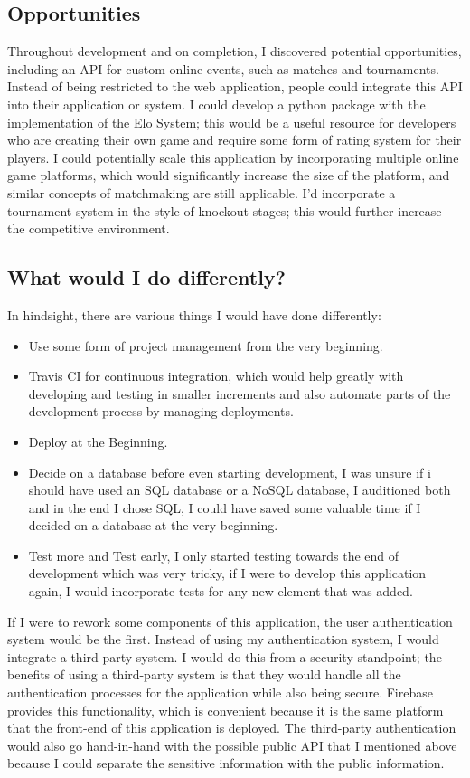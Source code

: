 \subsection{Opportunities}
Throughout development and on completion, I discovered potential opportunities, including an API for custom online events, such as matches and tournaments. Instead of being restricted to the web application, people could integrate this API into their application or system. I could develop a python package with the implementation of the Elo System; this would be a useful resource for developers who are creating their own game and require some form of rating system for their players.
I could potentially scale this application by incorporating multiple online game platforms, which would significantly increase the size of the platform, and similar concepts of matchmaking are still applicable. I'd incorporate a tournament system in the style of knockout stages; this would further increase the competitive environment.

\subsection{What would I do differently?}

In hindsight, there are various things I would have done differently:
\begin{itemize}
	\item Use some form of project management from the very beginning.
	\item Travis CI for continuous integration, which would help greatly with developing and testing in smaller increments and also automate parts of the development process by managing deployments.
	\item Deploy at the Beginning.
	\item Decide on a database before even starting development, I was unsure if i should have used an SQL database or a NoSQL database, I auditioned both and in the end I chose SQL, I could have saved some valuable time if I decided on a database at the very beginning.
	\item Test more and Test early, I only started testing towards the end of development which was very tricky, if I were to develop this application again, I would incorporate tests for any new element that was added.
\end{itemize}

If I were to rework some components of this application, the user authentication system would be the first. Instead of using my authentication system, I would integrate a third-party system. I would do this from a security standpoint; the benefits of using a third-party system is that they would handle all the authentication processes for the application while also being secure. Firebase provides this functionality, which is convenient because it is the same platform that the front-end of this application is deployed. The third-party authentication would also go hand-in-hand with the possible public API that I mentioned above because I could separate the sensitive information with the public information. \hfill \bigbreak

